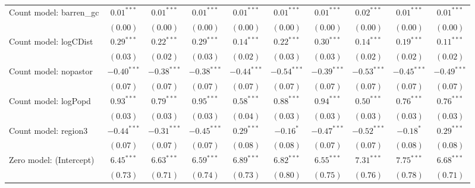 \begin{center}
\begin{longtable}{l c c c c c c c c c}
Count model: barren\_gc        & $0.01^{***}$  & $0.01^{***}$  & $0.01^{***}$  & $0.01^{***}$  & $0.01^{***}$    & $0.01^{***}$    & $0.02^{***}$  & $0.01^{***}$   & $0.01^{***}$  \\
                               & $(0.00)$      & $(0.00)$      & $(0.00)$      & $(0.00)$      & $(0.00)$        & $(0.00)$        & $(0.00)$      & $(0.00)$       & $(0.00)$      \\
Count model: logCDist          & $0.29^{***}$  & $0.22^{***}$  & $0.29^{***}$  & $0.14^{***}$  & $0.22^{***}$    & $0.30^{***}$    & $0.14^{***}$  & $0.19^{***}$   & $0.11^{***}$  \\
                               & $(0.03)$      & $(0.02)$      & $(0.03)$      & $(0.02)$      & $(0.03)$        & $(0.03)$        & $(0.02)$      & $(0.02)$       & $(0.02)$      \\
Count model: nopastor          & $-0.40^{***}$ & $-0.38^{***}$ & $-0.38^{***}$ & $-0.44^{***}$ & $-0.54^{***}$   & $-0.39^{***}$   & $-0.53^{***}$ & $-0.45^{***}$  & $-0.49^{***}$ \\
                               & $(0.07)$      & $(0.07)$      & $(0.07)$      & $(0.07)$      & $(0.07)$        & $(0.07)$        & $(0.07)$      & $(0.07)$       & $(0.07)$      \\
Count model: logPopd           & $0.93^{***}$  & $0.79^{***}$  & $0.95^{***}$  & $0.58^{***}$  & $0.88^{***}$    & $0.94^{***}$    & $0.50^{***}$  & $0.76^{***}$   & $0.76^{***}$  \\
                               & $(0.03)$      & $(0.03)$      & $(0.03)$      & $(0.04)$      & $(0.03)$        & $(0.03)$        & $(0.03)$      & $(0.03)$       & $(0.03)$      \\
Count model: region3           & $-0.44^{***}$ & $-0.31^{***}$ & $-0.45^{***}$ & $0.29^{***}$  & $-0.16^{*}$     & $-0.47^{***}$   & $-0.52^{***}$ & $-0.18^{*}$    & $0.29^{***}$  \\
                               & $(0.07)$      & $(0.07)$      & $(0.07)$      & $(0.08)$      & $(0.08)$        & $(0.07)$        & $(0.07)$      & $(0.08)$       & $(0.08)$      \\
Zero model: (Intercept)        & $6.45^{***}$  & $6.63^{***}$  & $6.59^{***}$  & $6.89^{***}$  & $6.82^{***}$    & $6.55^{***}$    & $7.31^{***}$  & $7.75^{***}$   & $6.68^{***}$  \\
                               & $(0.73)$      & $(0.71)$      & $(0.74)$      & $(0.73)$      & $(0.80)$        & $(0.75)$        & $(0.76)$      & $(0.78)$       & $(0.71)$      \\

\end{longtable}
\end{center}
